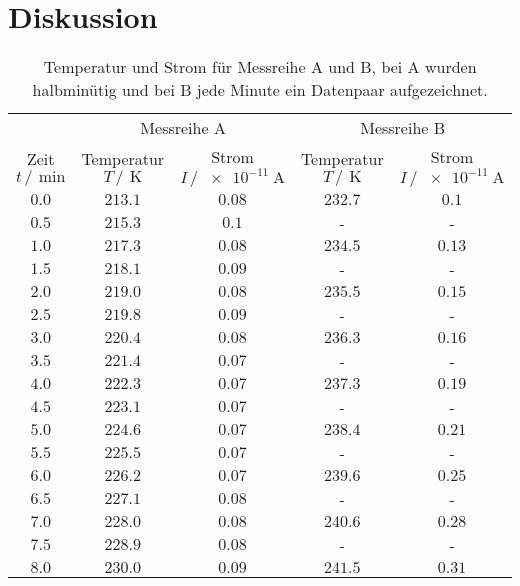 \section{Diskussion}
\label{sec:Diskussion}
\newpage
\begin{table}
    \centering
    \caption{Temperatur und Strom für Messreihe A und B, bei A wurden halbminütig und bei B jede Minute ein Datenpaar aufgezeichnet.}
    \label{tab:Messdaten_roh}
    \begin{tabular}{c c c c c}
        \toprule
        &\multicolumn{2}{c}{Messreihe A}&\multicolumn{2}{c}{Messreihe B}\\
        Zeit $t \,/\,\SI{}{\minute}$&Temperatur $T \,/\,\SI{}{\kelvin}$ &Strom $I \,/\,\SI{e-11}{\ampere}$&Temperatur $T \,/\,\SI{}{\kelvin}$ &Strom $I \,/\,\SI{e-11}{\ampere}$\\
        \midrule
        $\num{0.0}$&$\num{213.1}$&$\num{0.08}$&$\num{232.7}$&$\num{0.1}$\\
        $\num{0.5}$&$\num{215.3}$&$\num{0.1}$&-&-\\
        $\num{1.0}$&$\num{217.3}$&$\num{0.08}$&$\num{234.5}$&$\num{0.13}$\\
        $\num{1.5}$&$\num{218.1}$&$\num{0.09}$&-&-\\
        $\num{2.0}$&$\num{219.0}$&$\num{0.08}$&$\num{235.5}$&$\num{0.15}$\\
        $\num{2.5}$&$\num{219.8}$&$\num{0.09}$&-&-\\
        $\num{3.0}$&$\num{220.4}$&$\num{0.08}$&$\num{236.3}$&$\num{0.16}$\\
        $\num{3.5}$&$\num{221.4}$&$\num{0.07}$&-&-\\
        $\num{4.0}$&$\num{222.3}$&$\num{0.07}$&$\num{237.3}$&$\num{0.19}$\\
        $\num{4.5}$&$\num{223.1}$&$\num{0.07}$&-&-\\
        $\num{5.0}$&$\num{224.6}$&$\num{0.07}$&$\num{238.4}$&$\num{0.21}$\\
        $\num{5.5}$&$\num{225.5}$&$\num{0.07}$&-&-\\
        $\num{6.0}$&$\num{226.2}$&$\num{0.07}$&$\num{239.6}$&$\num{0.25}$\\
        $\num{6.5}$&$\num{227.1}$&$\num{0.08}$&-&-\\
        $\num{7.0}$&$\num{228.0}$&$\num{0.08}$&$\num{240.6}$&$\num{0.28}$\\
        $\num{7.5}$&$\num{228.9}$&$\num{0.08}$&-&-\\
        $\num{8.0}$&$\num{230.0}$&$\num{0.09}$&$\num{241.5}$&$\num{0.31}$\\

\end{tabular}
\end{table}

